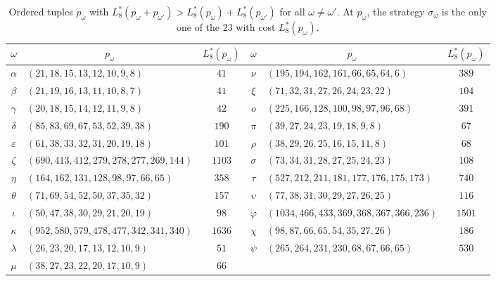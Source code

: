 \documentclass[12pt]{amsart}
\theoremstyle{definition}
\theoremstyle{remark}
\numberwithin{equation}{section}
\numberwithin{figure}{section}
\numberwithin{table}{section}
\newcommand{\omicron}{o}
\begin{document}
\begin{table}[t]
\centering
\footnotesize
\renewcommand{\arraystretch}{1.05}
\setlength{\tabcolsep}{4pt}
\begin{tabular}{clc@{\qquad}clc}
\toprule
$\omega$ & \multicolumn{1}{c}{$p_\omega$} & $L_8^*(p_\omega)$ & $\omega$ & \multicolumn{1}{c}{$p_\omega$} & $L_8^*(p_\omega)$\\
\midrule
$\alpha$ & $(21,18,15,13,12,10,9,8)$ & $41$ & $\nu$ & $(195,194,162,161,66,65,64,6)$ & $389$ \\
$\beta$ & $(21,19,16,13,11,10,8,7)$ & $41$ & $\xi$ & $(71,32,31,27,26,24,23,22)$ & $104$ \\
$\gamma$ & $(20,18,15,14,12,11,9,8)$ & $42$ & $\omicron$ & $(225,166,128,100,98,97,96,68)$ & $391$ \\
$\delta$ & $(85,83,69,67,53,52,39,38)$ & $190$ & $\pi$ & $(39,27,24,23,19,18,9,8)$ & $67$ \\
$\varepsilon$ & $(61,38,33,32,31,20,19,18)$ & $101$ & $\rho$ & $(38,29,26,25,16,15,11,8)$ & $68$ \\
$\zeta$ & $(690,413,412,279,278,277,269,144)$ & $1103$ & $\sigma$ & $(73,34,31,28,27,25,24,23)$ & $108$ \\
$\eta$ & $(164,162,131,128,98,97,66,65)$ & $358$ & $\tau$ & $(527,212,211,181,177,176,175,173)$ & $740$ \\
$\theta$ & $(71,69,54,52,50,37,35,32)$ & $157$ & $\upsilon$ & $(77,38,31,30,29,27,26,25)$ & $116$ \\
$\iota$ & $(50,47,38,30,29,21,20,19)$ & $98$ & $\varphi$ & $(1034,466,433,369,368,367,366,236)$ & $1501$ \\
$\kappa$ & $(952,580,579,478,477,342,341,340)$ & $1636$ & $\chi$ & $(98,87,66,65,54,35,27,26)$ & $186$ \\
$\lambda$ & $(26,23,20,17,13,12,10,9)$ & $51$ & $\psi$ & $(265,264,231,230,68,67,66,65)$ & $530$ \\
$\mu$ & $(38,27,23,22,20,17,10,9)$ & $66$ &  & &  \\
\bottomrule
\end{tabular}
\medskip
\caption{Ordered tuples $p_\omega$ with $L_8^*(p_\omega+p_{\omega'})>L_8^*(p_\omega)+L_8^*(p_{\omega'})$ for all $\omega\ne\omega'$. At $p_\omega$, the strategy $\sigma_\omega$ is the only one of the 23 with cost $L_8^*(p_\omega)$.}
\label{tab:cert}
\end{table}
\end{document}
